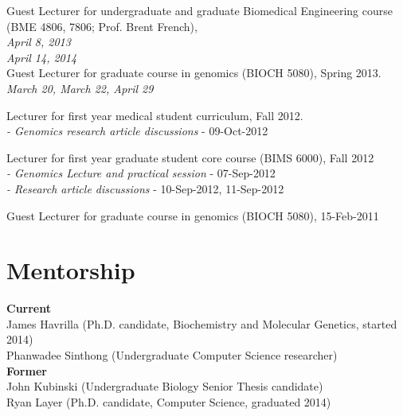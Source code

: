 \documentclass[margin,line]{cv}
\begin{document}
\begin{resume}
    \vspace{-2mm}
    Guest Lecturer for undergraduate and graduate Biomedical Engineering course (BME 4806, 7806; Prof. Brent French), \\
    \emph{April 8, 2013} \\
    \emph{April 14, 2014} \\


    Guest Lecturer for graduate course in genomics (BIOCH 5080), Spring 2013. \\
	\emph{March 20, March 22, April 29}

    Lecturer for first year medical student curriculum, Fall 2012. \\
	\emph{- Genomics research article discussions} - 09-Oct-2012

    \vspace{-2mm}
    Lecturer for first year graduate student core course (BIMS 6000), Fall 2012 \\
	\emph{- Genomics Lecture and practical session} - 07-Sep-2012 \\
	\emph{- Research article discussions} - 10-Sep-2012, 11-Sep-2012

    \vspace{-2mm}
    Guest Lecturer for graduate course in genomics (BIOCH 5080), 15-Feb-2011



    \section{\mysidestyle Mentorship}
    \textbf{Current} \\
    James Havrilla (Ph.D. candidate, Biochemistry and Molecular Genetics, started 2014) \\
    Phanwadee Sinthong (Undergraduate Computer Science researcher) \\

    \textbf{Former} \\
    John Kubinski (Undergraduate Biology Senior Thesis candidate)  \\
    Ryan Layer (Ph.D. candidate, Computer Science, graduated 2014) \\



\end{resume}
\end{document}
